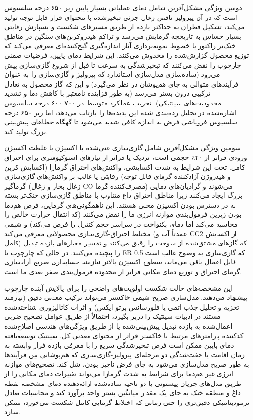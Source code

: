 \documentclass[12pt, a4paper]{article}
\begin{document}
دومین ویژگی مشکل‌آفرین شامل دمای عملیاتی بسیار پایین زیر ۶۵۰ درجه سلسیوس است که در آن پیرولیز ناقص زغال جزئی-تبخیرشده با محتوای فرار قابل توجه تولید می‌کند، تشکیل قطران به حداکثر بازده از طریق مسیرهای شکست و بسپارش رقابتی بسیار حساس به تاریخچه گرمایش می‌رسد و تراکم هیدروکربن‌های سنگین در مناطق خنک‌تر راکتور یا خطوط نمونه‌برداری آثار اندازه‌گیری گیج‌کننده‌ای معرفی می‌کند که توزیع محصول گزارش‌شده را مخدوش می‌کنند. این شرایط دمای پایین، فرضیات ضمنی چارچوب را نقض می‌کنند که تبخیرشدگی به سرعت تا قبل از شروع گازی‌سازی پیش می‌رود (ساده‌سازی مدل‌سازی استاندارد که پیرولیز و گازی‌سازی را به عنوان فرآیندهای متوالی به جای هم‌پوشان در نظر می‌گیرد) و این که گاز محصول به تعادل ترکیبی درون بستر می‌رسد (به طور فزاینده نامعتبر با کاهش دما و تشدید محدودیت‌های سینتیکی). تخریب عملکرد متوسط در ۷۰۰-۶۰۰ درجه سلسیوس اشاره‌شده در تحلیل رده‌بندی شده این پدیده‌ها را بازتاب می‌دهد، اما زیر ۶۵۰ درجه سلسیوس فروپاشی فرض به اندازه کافی شدید می‌شود تا گهگاه خطاهای پیش‌بینی بزرگ تولید کند.

سومین ویژگی مشکل‌آفرین شامل گازی‌سازی غنی‌شده با اکسیژن با غلظت اکسیژن ورودی فراتر از ۴۰٪ حجمی است، نزدیک یا فراتر از نیازهای استوکیومتری برای احتراق کامل. تحت این شرایط به شدت اکسایشی، واکنش‌های احتراق گرمازا (اکسایش کربن و هیدروژن آزادکننده گرمای قابل توجه) رقابتی یا غالب بر واکنش‌های گازی‌سازی گرماگیر (زغال-بخار و زغال-CO مصرف‌کننده گرما) می‌شوند و گرادیان‌های دمایی بزرگ ایجاد می‌کنند زیرا مناطق احتراق داغ متناوب با مناطق گازی‌سازی خنک‌تر بسته به در دسترس بودن اکسیژن محلی هستند. این ناهمگونی‌های گرمایی، فرض هم‌دما بودن زیرین فرمول‌بندی موازنه انرژی ما را نقض می‌کنند (که انتقال حرارت خالص را محاسبه می‌کند اما دمای یکنواخت در سراسر حجم کنترل را فرض می‌کند) و شیمی مختلط احتراق-گازی‌سازی محصولاتی معرفی می‌کند (عمدتاً آب و CO2 از اکسایش کامل) که گازهای مشتق‌شده از سوخت را رقیق می‌کنند و تفسیر معیارهای بازده تبدیل را پیچیده می‌کنند. در حالی که چارچوب تا ER 0.5 که گازی‌سازی به وضوح غالب است قابل اعمال باقی می‌ماند، سطوح اکسیژن بالاتر نیازمند حسابداری صریح آزادسازی گرمای احتراق و توزیع دمای مکانی فراتر از محدوده فرمول‌بندی صفر بعدی ما است.

این مشخصه‌های حالت شکست اولویت‌های واضحی را برای پالایش آینده چارچوب پیشنهاد می‌دهند. مدل‌سازی صریح شیمی خاکستر می‌تواند ترکیب معدنی دقیق (نیازمند تجزیه و تحلیل جذب اتمی یا فلورسانس پرتو ایکس) و اثرات کاتالیزوری شناخته‌شده مستند در ادبیات سینتیک را دربر بگیرد، احتمالاً از طریق عوامل تصحیح ضربی اعمال‌شده به بازده تبدیل پیش‌بینی‌شده یا از طریق ویژگی‌های هندسی اصلاح‌شده کدکننده پارامترهای مرتبط با خاکستر فراتر از محتوای معدنی کل. سینتیک توسعه‌یافته دمای پایین ممکن است فرض تبخیرشدگی سریع را با معرفی بازده فرار وابسته به زمان اقامت یا جفت‌شدگی دو مرحله‌ای پیرولیز-گازی‌سازی که هم‌پوشانی بین فرآیندها به طور صریح مدل‌سازی می‌شود به جای فرض ناچیز بودن، شل کند. تصحیح‌های موازنه انرژی غیر هم‌دما برای شرایط به شدت گرمازا می‌تواند تغییرات دمای مکانی را از طریق مدل‌های جریان پیستونی یا دو ناحیه ساده‌شده ارائه‌دهنده دمای مشخصه نقطه داغ و منطقه خنک به جای یک مقدار میانگین بستر واحد برآورد کند و محاسبات تعادل ترمودینامیکی دقیق‌تری را حتی زمانی که اختلاط گرمایی کامل شکست می‌خورد، ممکن سازد.
\end{document}
